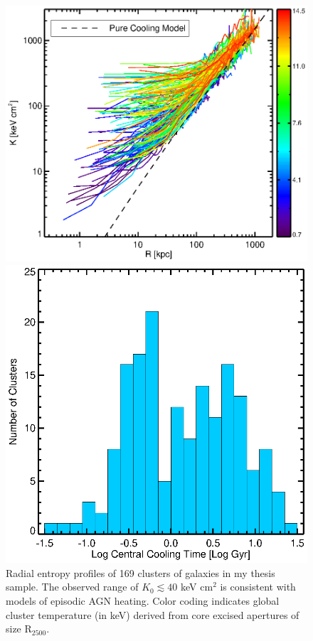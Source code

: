 \documentclass[11pt]{article}
\begin{document}
\clearpage
\begin{figure}[t]
    \begin{minipage}[t]{0.5\linewidth}
        \centering
	\includegraphics*[width=\textwidth, trim=28mm 8mm 30mm 10mm, clip]{splots}
        \caption{\small Radial entropy profiles of 169 clusters of
	galaxies in my thesis sample. The observed range of $K_0 \lesssim
	40$ keV cm$^2$ is consistent with models of episodic AGN
	heating. Color coding indicates global cluster temperature (in keV)
	derived from core excised apertures of size R$_{2500}$.}
	\label{fig:splots}
    \end{minipage}
    \hspace{0.1in}
    \begin{minipage}[t]{0.5\linewidth}
        \centering
        \includegraphics*[width=\textwidth, trim=28mm 8mm 30mm 10mm, clip]{tcool}

\end{minipage}
\end{figure}
\end{document}
